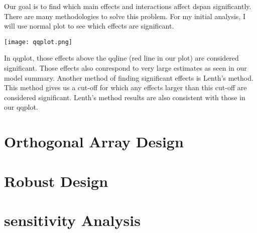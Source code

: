 \documentclass[11pt]{article}
\begin{document}
Our goal is to find which main effects and interactions affect dspan significantly. There are many methodologies to solve this problem. For my initial analysis, I will use normal plot to see which effects are significant. 
\begin{center}
\texttt{[image: qqplot.png]}
\end{center}
In qqplot, those effects above the qqline (red line in our plot) are considered significant. Those effects also conrespond to very large estimates as seen in our model summary. Another method of finding significant effects is Lenth's method. This method gives us a cut-off for which any effects larger than this cut-off are considered significant. Lenth's method results are also consistent with those in our qqplot.

\section{Orthogonal Array Design}
\section{Robust Design}
\section{sensitivity Analysis}
\end{document}
